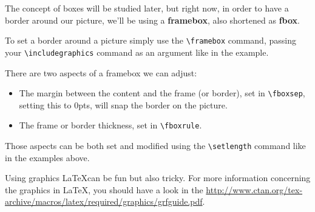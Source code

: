 \documentclass[a4paper]{article}
\begin{document}
\setlength\fboxsep{1pt}
\setlength\fboxrule{1pt}

The concept of boxes will be studied later, but right now, in order to have a
border around our picture, we'll be using a \textbf{framebox}, also shortened
as \textbf{fbox}.

To set a border around a picture simply use the \verb`\framebox` command,
passing your \verb`\includegraphics` command as an argument like in the example.

There are two aspects of a framebox we can adjust:
\begin{itemize}
    \item The margin between the content and the frame (or border), set in
    \verb`\fboxsep`, setting this to 0pts, will snap the border on the picture.
    \item The frame or border thickness, set in \verb`\fboxrule`.
\end{itemize}

Those aspects can be both set and modified using the \verb`\setlength` command
like in the examples above.


Using graphics \LaTeX can be fun but also tricky. For more information
concerning the graphics in \LaTeX, you should have a look in the
\href{official graphics guide}
{http://www.ctan.org/tex-archive/macros/latex/required/graphics/grfguide.pdf}.
\end{document}
